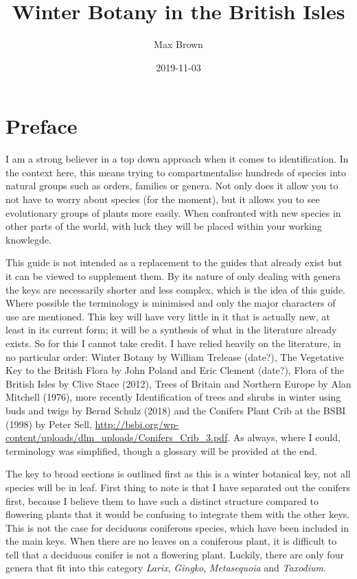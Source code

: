 \documentclass[openany]{book}
\title{Winter Botany in the British Isles}
\author{Max Brown}
\date{2019-11-03}
\begin{document}
\maketitle

{
\setcounter{tocdepth}{1}
\tableofcontents
}
\hypertarget{preface}{%
\chapter*{Preface}\label{preface}}

I am a strong believer in a top down approach when it comes to
identification. In the context here, this means trying to
compartmentalise hundreds of species into natural groups such as orders,
families or genera. Not only does it allow you to not have to worry
about species (for the moment), but it allows you to see evolutionary
groups of plants more easily. When confronted with new species in other
parts of the world, with luck they will be placed within your working
knowlegde.

This guide is not intended as a replacement to the guides that already
exist but it can be viewed to supplement them. By its nature of only
dealing with genera the keys are necessarily shorter and less complex,
which is the idea of this guide. Where possible the terminology is
minimised and only the major characters of use are mentioned. This key
will have very little in it that is actually new, at least in its
current form; it will be a synthesis of what in the literature already
exists. So for this I cannot take credit. I have relied heavily on the
literature, in no particular order: Winter Botany by William Trelease
(date?), The Vegetative Key to the British Flora by John Poland and Eric
Clement (date?), Flora of the British Isles by Clive Stace (2012), Trees
of Britain and Northern Europe by Alan Mitchell (1976), more recently
Identification of trees and shrubs in winter using buds and twigs by
Bernd Schulz (2018) and the Conifers Plant Crib at the BSBI (1998) by
Peter Sell,
\url{http://bsbi.org/wp-content/uploads/dlm_uploads/Conifers_Crib_3.pdf}.
As always, where I could, terminology was simplified, though a glossary
will be provided at the end.

The key to broad sections is outlined first as this is a winter
botanical key, not all species will be in leaf. First thing to note is
that I have separated out the conifers first, because I believe them to
have such a distinct structure compared to flowering plants that it
would be confusing to integrate them with the other keys. This is not
the case for deciduous coniferous species, which have been included in
the main keys. When there are no leaves on a coniferous plant, it is
difficult to tell that a deciduous conifer is not a flowering plant.
Luckily, there are only four genera that fit into this category
\emph{Larix}, \emph{Gingko}, \emph{Metasequoia} and \emph{Taxodium}.
\end{document}
